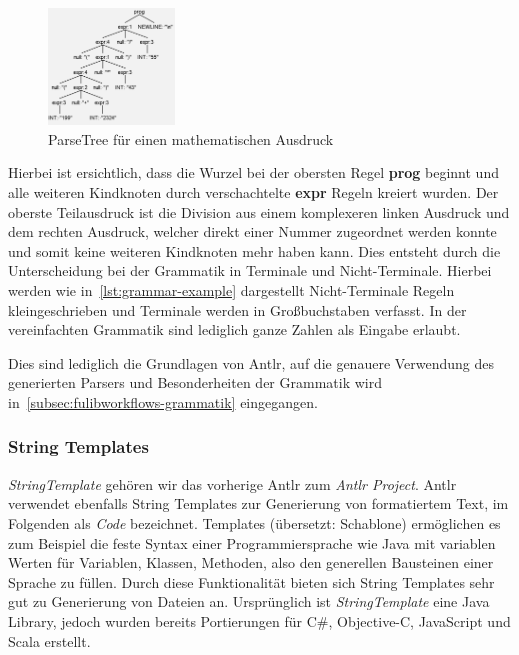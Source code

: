 \begin{figure}[h]
    \centering
    \includegraphics[width=0.3\textwidth]{images/2.2/parseTreeExample}
    \caption{ParseTree für einen mathematischen Ausdruck}
    \label{fig:parse-example}
\end{figure}

Hierbei ist ersichtlich, dass die Wurzel bei der obersten Regel \textbf{prog} beginnt und alle weiteren Kindknoten durch verschachtelte \textbf{expr} Regeln kreiert wurden.
Der oberste Teilausdruck ist die Division aus einem komplexeren linken Ausdruck und dem rechten Ausdruck, welcher direkt einer Nummer zugeordnet werden konnte und somit keine weiteren Kindknoten mehr haben kann.
Dies entsteht durch die Unterscheidung bei der Grammatik in Terminale und Nicht-Terminale.
Hierbei werden wie in~\ref{lst:grammar-example} dargestellt Nicht-Terminale Regeln kleingeschrieben und Terminale werden in Großbuchstaben verfasst.
In der vereinfachten Grammatik sind lediglich ganze Zahlen als Eingabe erlaubt.

Dies sind lediglich die Grundlagen von Antlr, auf die genauere Verwendung des generierten Parsers und Besonderheiten der Grammatik wird in~\ref{subsec:fulibworkflows-grammatik} eingegangen.

\subsubsection{String Templates}
\textit{StringTemplate} gehören wir das vorherige Antlr zum \textit{Antlr Project}.
Antlr verwendet ebenfalls String Templates zur Generierung von formatiertem Text, im Folgenden als \textit{Code} bezeichnet.
Templates (übersetzt: Schablone) ermöglichen es zum Beispiel die feste Syntax einer Programmiersprache wie Java mit variablen Werten für
Variablen, Klassen, Methoden, also den generellen Bausteinen einer Sprache zu füllen.
Durch diese Funktionalität bieten sich String Templates sehr gut zu Generierung von Dateien an.
Ursprünglich ist \textit{StringTemplate} eine Java Library, jedoch wurden bereits Portierungen für C#, Objective-C, JavaScript und Scala erstellt.

